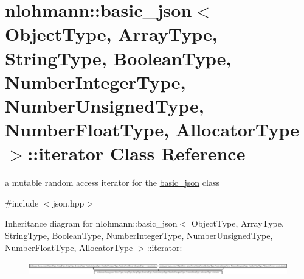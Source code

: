\hypertarget{classnlohmann_1_1basic__json_1_1iterator}{\section{nlohmann\-:\-:basic\-\_\-json$<$ Object\-Type, Array\-Type, String\-Type, Boolean\-Type, Number\-Integer\-Type, Number\-Unsigned\-Type, Number\-Float\-Type, Allocator\-Type $>$\-:\-:iterator Class Reference}
\label{classnlohmann_1_1basic__json_1_1iterator}
}


a mutable random access iterator for the \hyperlink{classnlohmann_1_1basic__json}{basic\-\_\-json} class  




{\ttfamily \#include $<$json.\-hpp$>$}

Inheritance diagram for nlohmann\-:\-:basic\-\_\-json$<$ Object\-Type, Array\-Type, String\-Type, Boolean\-Type, Number\-Integer\-Type, Number\-Unsigned\-Type, Number\-Float\-Type, Allocator\-Type $>$\-:\-:iterator\-:\begin{figure}[H]
\begin{center}
\leavevmode
\includegraphics[height=0.568528cm]{d4/d0f/classnlohmann_1_1basic__json_1_1iterator}
\end{center}
\end{figure}
